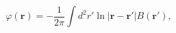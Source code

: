 \begin{equation}
\label{Eq_0202}
\varphi(\textbf{r}) =
	-\frac{1}{2\pi} \int d^2r'
	\ln |\textbf{r} - \textbf{r}'| B(\textbf{r}'),
\end{equation}

